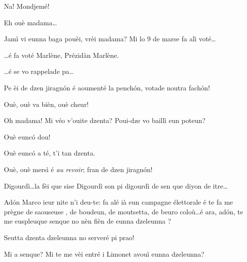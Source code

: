 \begin{drama}
\Saventaspeaks Na! Mondjemé!

\Joellespeaks Eh ouè madama\ldots

\Dallasspeaks Jamì vi eunna baga pouèi, vrèi madama? Mi lo 9 de marse fa alì voté\ldots

\Joellespeaks \ldots é fa voté Marlène, Prézidàn Marlène.

\Dallasspeaks \ldots é se vo rappelade pa\ldots

\Joelledallasspeaks {} Pe èi de dzen jiragn\'on é aoumenté la pench\'on, votade noutra fach\'on!


\Saventaspeaks Ouè, ouè va bièn, ouè cheur!

\Dallasspeaks  Oh madama! Mi véo v'ouite dzenta? Poui-dze vo baillì eun poteun?

\Saventaspeaks {} Ouè eunc\'o dou!


\Saventaspeaks {} Ouè eunc\'o a té, t'i tan dzenta.

\Joellespeaks {} Ouè, ouè mersì é \textit{au revoir};  fran de dzen jiragn\'on!


\Saventaspeaks {} Digourdì\ldots la fèi que sise Digourdì son pi digourdì de sen que diyon de itre\ldots



\Cimaspeaks Ad\'on Marco ieur nite n'i deu-te: fa alé ià eun campagne élettorale é te fa me prègne de saouseuse \salan, de boudeun, de moutsetta, de beuro coloù\ldots é ara, ad\'on, te me euspleuque senque no nèn fièn de eunna dzeleunna \gallina ?

\Marcospeaks {} Seutta dzenta dzeleunna  no serveré pi prao!

\Cimaspeaks  Mi a senque? Mi te me vèi entré i Limonet avouì eunna dzeleunna?


\end{drama}
